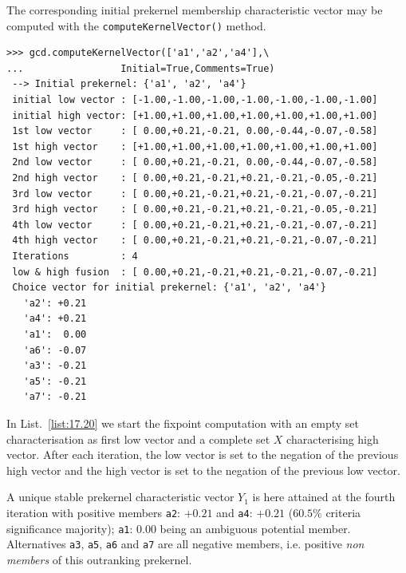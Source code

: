 The corresponding initial prekernel membership characteristic vector may be computed with the \texttt{computeKernelVector()} method.
\begin{lstlisting}[caption={Fixpoint iterations for initial prekernel \texttt{\{a1, a2, a4\}}},label=list:17.20]
>>> gcd.computeKernelVector(['a1','a2','a4'],\
...                 Initial=True,Comments=True)
 --> Initial prekernel: {'a1', 'a2', 'a4'}
 initial low vector : [-1.00,-1.00,-1.00,-1.00,-1.00,-1.00,-1.00]
 initial high vector: [+1.00,+1.00,+1.00,+1.00,+1.00,+1.00,+1.00]
 1st low vector     : [ 0.00,+0.21,-0.21, 0.00,-0.44,-0.07,-0.58]
 1st high vector    : [+1.00,+1.00,+1.00,+1.00,+1.00,+1.00,+1.00]
 2nd low vector     : [ 0.00,+0.21,-0.21, 0.00,-0.44,-0.07,-0.58]
 2nd high vector    : [ 0.00,+0.21,-0.21,+0.21,-0.21,-0.05,-0.21]
 3rd low vector     : [ 0.00,+0.21,-0.21,+0.21,-0.21,-0.07,-0.21]
 3rd high vector    : [ 0.00,+0.21,-0.21,+0.21,-0.21,-0.05,-0.21]
 4th low vector     : [ 0.00,+0.21,-0.21,+0.21,-0.21,-0.07,-0.21]
 4th high vector    : [ 0.00,+0.21,-0.21,+0.21,-0.21,-0.07,-0.21]
 Iterations         : 4
 low & high fusion  : [ 0.00,+0.21,-0.21,+0.21,-0.21,-0.07,-0.21]
 Choice vector for initial prekernel: {'a1', 'a2', 'a4'}
   'a2': +0.21
   'a4': +0.21
   'a1':  0.00
   'a6': -0.07
   'a3': -0.21
   'a5': -0.21
   'a7': -0.21
\end{lstlisting}
In List.~\vref{list:17.20} we start the fixpoint computation with an empty set characterisation as first low vector and a complete set $X$ characterising high vector. After each iteration, the low vector is set to the negation of the previous high vector and the high vector is set to the negation of the previous low vector.

A unique stable prekernel characteristic vector $Y_1$ is here attained at the fourth iteration with positive members \texttt{a2}: $+0.21$ and \texttt{a4}: $+0.21$ ($60.5\%$ criteria significance majority); \texttt{a1}: $0.00$ being an ambiguous potential member. Alternatives \texttt{a3}, \texttt{a5}, \texttt{a6} and \texttt{a7} are all negative members, i.e. positive \emph{non members} of this outranking prekernel.

